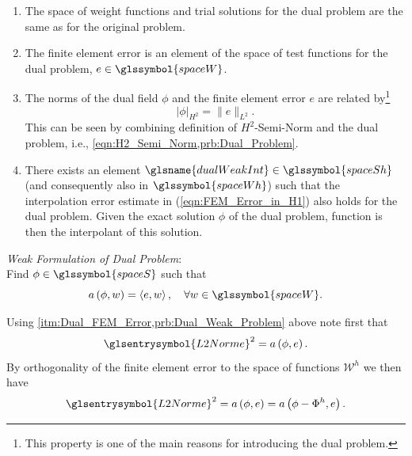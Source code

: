 \begin{enumerate}
	\item \label{itm:Dual_Same_Space}
	The space of weight functions and trial solutions for the dual problem are the same as for the original problem.
	
	\item	\label{itm:Dual_FEM_Error}
	The finite element error is an element of the space of test functions for the dual problem, $e \in \glssymbol{spaceW}$.
	
	\item \label{itm:Dual_Norm_Relation}
	The norms of the dual field $\phi$ and the finite element error $e$ are related by\footnote{This property is one of the main reasons for
	introducing the dual problem.}
	\begin{equation}
		\big \vert \phi \big \vert_{H^2} = \big\| e  \big\|_{L^2}.
	\end{equation}
	This can be seen by combining definition of $H^2$-Semi-Norm and the dual problem, i.e., \cref{eqn:H2_Semi_Norm,prb:Dual_Problem}.
		
	\item \label{itm:Interpolant_Estimate}
	There exists an element $\glsname{dualWeakInt} \in \glssymbol{spaceSh}$ (and consequently also in $\glssymbol{spaceWh}$) such that the interpolation
	error estimate in (\ref{eqn:FEM_Error_in_H1}) also holds for the dual problem. Given the exact solution $\phi$ of the dual
	problem, function  is then the interpolant of this solution.
\end{enumerate}
%
\begin{problem}	\label{prb:Dual_Weak_Problem}
	\textit{Weak Formulation of Dual Problem}:	\\
	Find $\phi \in \glssymbol{spaceS}$ such that
	\begin{equation}
		a \left( \phi, w \right) = \left \langle e, w \right \rangle,	\quad \forall w \in \glssymbol{spaceW}.
	\end{equation}
\end{problem}
Using \cref{itm:Dual_FEM_Error,prb:Dual_Weak_Problem} above note first that
\begin{equation}
	\glsentrysymbol{L2Norme}^2 = a \left( \phi, e \right).
\end{equation}
By orthogonality of the finite element error to the space of functions $\mathcal{W}^h$ we then have
\begin{equation}	\label{eqn:Orthogonality_e_Wh_1}
	\glsentrysymbol{L2Norme}^2 = a \left( \phi, e \right) = a \left( \phi - \Phi^h, e \right).
\end{equation}
